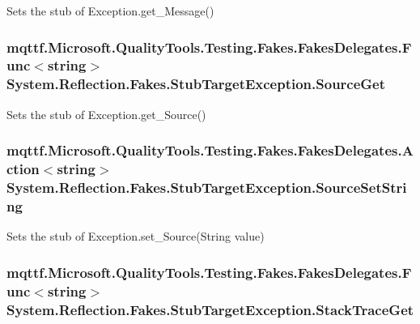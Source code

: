 Sets the stub of Exception.\-get\-\_\-\-Message()

\hypertarget{class_system_1_1_reflection_1_1_fakes_1_1_stub_target_exception_ada22299570c1a89b142f42a876d1bbae}{
\subsubsection[{Source\-Get}]{\setlength{\rightskip}{0pt plus 5cm}mqttf.\-Microsoft.\-Quality\-Tools.\-Testing.\-Fakes.\-Fakes\-Delegates.\-Func$<$string$>$ System.\-Reflection.\-Fakes.\-Stub\-Target\-Exception.\-Source\-Get}}\label{class_system_1_1_reflection_1_1_fakes_1_1_stub_target_exception_ada22299570c1a89b142f42a876d1bbae}


Sets the stub of Exception.\-get\-\_\-\-Source()

\hypertarget{class_system_1_1_reflection_1_1_fakes_1_1_stub_target_exception_a60907a4b14cb357fead3c9f8732f1e24}{
\subsubsection[{Source\-Set\-String}]{\setlength{\rightskip}{0pt plus 5cm}mqttf.\-Microsoft.\-Quality\-Tools.\-Testing.\-Fakes.\-Fakes\-Delegates.\-Action$<$string$>$ System.\-Reflection.\-Fakes.\-Stub\-Target\-Exception.\-Source\-Set\-String}}\label{class_system_1_1_reflection_1_1_fakes_1_1_stub_target_exception_a60907a4b14cb357fead3c9f8732f1e24}


Sets the stub of Exception.\-set\-\_\-\-Source(\-String value)

\hypertarget{class_system_1_1_reflection_1_1_fakes_1_1_stub_target_exception_aa20834668ea7e4ed45b6ed92815f48cb}{
\subsubsection[{Stack\-Trace\-Get}]{\setlength{\rightskip}{0pt plus 5cm}mqttf.\-Microsoft.\-Quality\-Tools.\-Testing.\-Fakes.\-Fakes\-Delegates.\-Func$<$string$>$ System.\-Reflection.\-Fakes.\-Stub\-Target\-Exception.\-Stack\-Trace\-Get}}\label{class_system_1_1_reflection_1_1_fakes_1_1_stub_target_exception_aa20834668ea7e4ed45b6ed92815f48cb}


